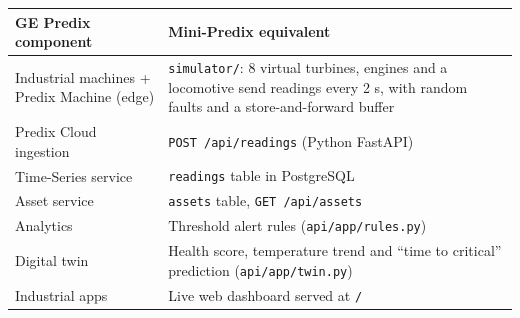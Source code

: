 \documentclass[12pt,a4paper]{article}
\begin{document}
\begin{center}
\begin{tabularx}{\linewidth}{@{}p{5.6cm}L@{}}
\toprule
\textbf{GE Predix component} & \textbf{Mini-Predix equivalent} \\
\midrule
Industrial machines + Predix Machine (edge) & \texttt{simulator/}: 8 virtual turbines, engines and a locomotive send readings every 2 s, with random faults and a store-and-forward buffer \\
Predix Cloud ingestion & \texttt{POST /api/readings} (Python FastAPI) \\
Time-Series service & \texttt{readings} table in PostgreSQL \\
Asset service & \texttt{assets} table, \texttt{GET /api/assets} \\
Analytics & Threshold alert rules (\texttt{api/app/rules.py}) \\
Digital twin & Health score, temperature trend and ``time to critical'' prediction (\texttt{api/app/twin.py}) \\
Industrial apps & Live web dashboard served at \texttt{/} \\
\bottomrule
\end{tabularx}
\end{center}
\end{document}
